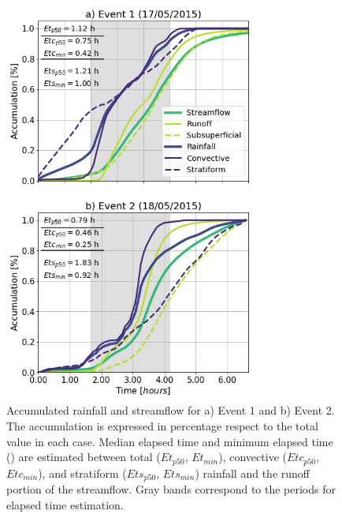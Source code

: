 \documentclass[hess, manuscript]{copernicus}
\begin{document}
\begin{figure}[t]
\centering
 \includegraphics[width=8.3cm]{Figures/Rain_Streamflow_Elapsed.png}
 \caption{Accumulated rainfall and streamflow for a)  Event 1 and b) Event 2. The accumulation is expressed in percentage respect to the total value in each case. Median elapsed time and minimum elapsed time () are estimated between total ($Et_{p50}$, $Et_{min}$), convective ($Etc_{p50}$, $Etc_{min}$), and stratiform ($Ets_{p50}$, $Ets_{min}$) rainfall and the runoff portion of the streamflow.  Gray bands correspond to the periods for elapsed time estimation.}
    \label{fig:lluviaElapsedCaudal}
\end{figure}

\end{document}
